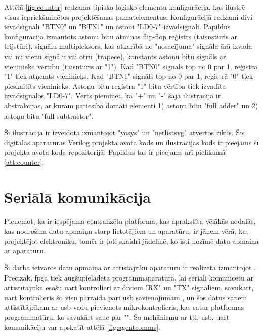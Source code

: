 Attēlā \ref{fig:counter} redzama tipiska loģisko elementu konfigurācija, kas
ilustrē visus iepriekšminētos projektēšanas pamatelementus. Konfigurācijā
redzami divi ievadsignāli "BTN0" un "BTN1" un astoņi "LD{0-7}" izvadsignāli.
Papildus konfigurācijā izmantots astoņu bitu atmiņas flip-flop reģistrs
(taisnstūris ar trijstūri), signālu multipleksors, kas atkarībā no "nosacījuma"
signāla ārā izvada vai nu vienu signālu vai otru (trapece), konstants astoņu
bitu signāls ar vieninieka vērtību (taisntūris ar "1"). Kad "BTN0" signāls top
no 0 par 1, reģistrā "1" tiek atņemts vieninieks. Kad "BTN1" signāls top no 0
par 1, reģistrā "0" tiek pieskaitīts vieninieks. Astoņu bitu reģistra "1" bitu
vērtība tiek izvadīta izvadsignālos "LD{0-7}". Vērts pieminēt, ka "+" un "-"
šajā ilustrācijā ir abstrakcijas, ar kurām patiesībā domāti elementi 1) astoņu
bitu "full adder" un 2) astoņu bitu "full subtractor".

Šī ilustrācija ir izveidota izmantojot "yosys" un "netlistsvg" atvērtos rīkus.
Šīs digitālās aparatūras Verilog projekta avota kods un ilustrācijas kods ir
pieejams šī projekta avota koda repozitorijā. \cite{VeinbahsKrisjanisTestbed}
Papildus tas ir pieejams arī pielikumā \ref{att:counter}.

\section{Seriālā komunikācija}

Pieņemot, ka ir iespējama centralizēta platforma, kas aprakstīta vēlākās
nodaļās, kas nodrošina datu apmaiņu starp lietotājiem un aparatūru, ir jāņem
vērā, ka, projektējot elektroniku, tomēr ir ļoti skaidri jādefinē, ko īsti
nozīmē datu apmaiņa ar aparatūru.

Šī darba ietvaros datu apmaiņa ar attīstājrīku aparatūru ir realizēta izmantojot
. Precīzāk, \gls{fpga} tiek
augšupielādēta programmaparatūra, lai seriāli komunicētu ar attīstītājrīkā esošu
\gls{uart} kontrolieri ar diviem "RX" un "TX" signāliem, savukārt,
\gls{uart} kontrolieris šo visu pārraida pāri \gls{usb} savienojumam
\cite[para. USB-UART Bridge]{DigilentAnvylReference}, un šos datus saņem
attīstītājrīkam ar \gls{usb} vadu pievienots mikrokontrolieris, kas satur
platformas programmatūru, ko savukārt sauc par "". Šo
mehānismu ar \gls{ttl}, \gls{usb}, \gls{uart} komunikāciju var
apskatīt attēlā \ref{fig:agentcomms}.


